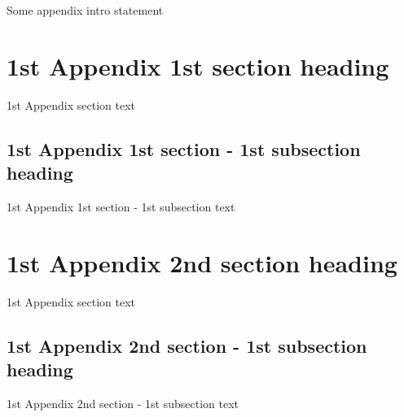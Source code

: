 Some appendix intro statement

\section[1st Appendix 1st section ToC title]{1st Appendix 1st section heading}

1st Appendix section text

\subsection[1st Appendix 1st section - 1st subsection ToC title]{1st Appendix 1st section - 1st subsection heading}

1st Appendix 1st section - 1st subsection text

\section[1st Appendix 2nd section ToC title]{1st Appendix 2nd section heading}

1st Appendix section text

\subsection[1st Appendix 2nd section - 1st subsection ToC title]{1st Appendix 2nd section - 1st subsection heading}

1st Appendix 2nd section - 1st subsection text
